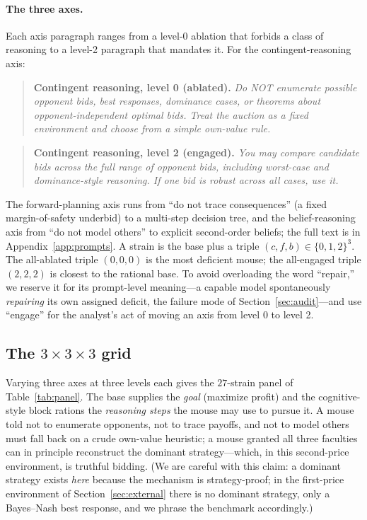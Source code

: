 \documentclass[12pt]{article}
\begin{document}
\paragraph{The three axes.} Each axis paragraph ranges from a level-0 ablation
that forbids a class of reasoning to a level-2 paragraph that mandates it. For the
contingent-reasoning axis:
\begin{quote}\small
\textbf{Contingent reasoning, level 0 (ablated).}\itshape{} Do NOT enumerate
possible opponent bids, best responses, dominance cases, or theorems about
opponent-independent optimal bids. Treat the auction as a fixed environment and
choose from a simple own-value rule.
\end{quote}
\begin{quote}\small
\textbf{Contingent reasoning, level 2 (engaged).}\itshape{} You may compare
candidate bids across the full range of opponent bids, including worst-case and
dominance-style reasoning. If one bid is robust across all cases, use it.
\end{quote}
\noindent The forward-planning axis runs from ``do not trace consequences''
(a fixed margin-of-safety underbid) to a multi-step decision tree, and the
belief-reasoning axis from ``do not model others'' to explicit second-order
beliefs; the full text is in Appendix~\ref{app:prompts}. A strain is the base plus
a triple $(c,f,b)\in\{0,1,2\}^3$. The all-ablated triple $(0,0,0)$ is the most
deficient mouse; the all-engaged triple $(2,2,2)$ is closest to the rational base.
To avoid overloading the word ``repair,'' we reserve it for its prompt-level
meaning---a capable model spontaneously \emph{repairing} its own assigned deficit,
the failure mode of Section~\ref{sec:audit}---and use ``engage'' for the analyst's
act of moving an axis from level 0 to level 2.

\subsection{The $3\times3\times3$ grid}

Varying three axes at three levels each gives the $27$-strain panel of
Table~\ref{tab:panel}. The base supplies the \emph{goal} (maximize profit) and the
cognitive-style block rations the \emph{reasoning steps} the mouse may use to
pursue it. A mouse told not to enumerate opponents, not to trace payoffs, and not
to model others must fall back on a crude own-value heuristic; a mouse granted all
three faculties can in principle reconstruct the dominant strategy---which, in this
second-price environment, is truthful bidding. (We are careful with this claim: a
dominant strategy exists \emph{here} because the mechanism is strategy-proof; in
the first-price environment of Section~\ref{sec:external} there is no dominant
strategy, only a Bayes--Nash best response, and we phrase the benchmark
accordingly.)
\end{document}
